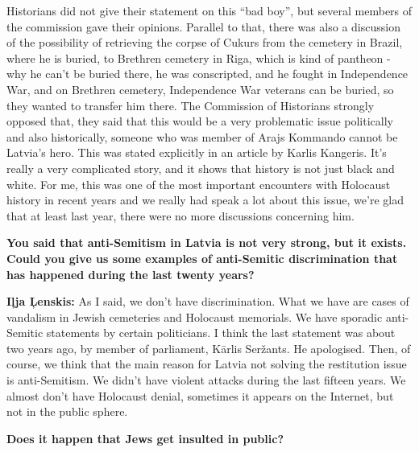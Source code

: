 Historians did not give their  statement on this ``bad boy'', but several members of the commission gave their opinions. Parallel to that, there was also a discussion of the possibility of retrieving the corpse of Cukurs from the cemetery in Brazil, where he is buried, to Brethren cemetery in Riga, which is kind of pantheon - why he can't be buried there, he was conscripted, and he fought in Independence War,  and on Brethren cemetery, Independence War veterans can be buried, so they wanted to transfer him there. The Commission of Historians strongly opposed that, they said that this would be a very problematic issue politically and also historically, someone who was member of Arajs Kommando cannot be Latvia's hero. This was stated explicitly in an article by Karlis Kangeris. It's really a very complicated story, and it shows that history is not just black and white. For me, this was one of the most important encounters with Holocaust history in recent years and we really had speak a lot about this issue, we’re glad that at least last year, there were no more discussions concerning him. 

\textbf{You said that anti-Semitism in Latvia is not very strong, but it exists. Could you give us some examples of anti-Semitic discrimination that has happened during the last twenty years?} 

\textbf{Iļja Ļenskis:} As I said, we don’t have discrimination. What we have are cases of vandalism in Jewish cemeteries and Holocaust memorials. We have sporadic anti-Semitic statements by certain politicians. I think the last statement was about two years ago, by member of parliament, Kārlis Seržants. He apologised. Then, of course, we think that the main reason for Latvia not solving the restitution issue is anti-Semitism. We didn't have violent attacks during the last fifteen years. We almost don’t have Holocaust denial, sometimes it appears on the Internet, but not in the public sphere.

\textbf{Does it happen that Jews get insulted in public?} 

